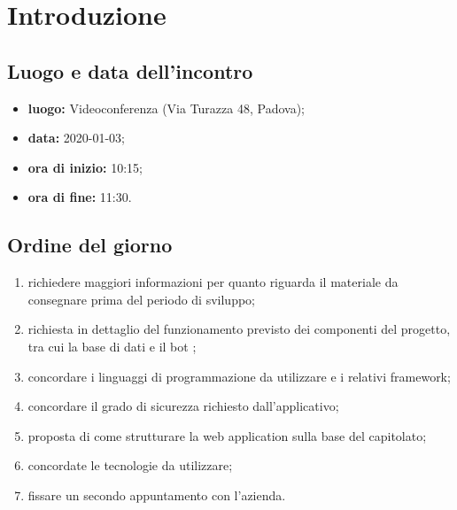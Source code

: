 \section*{Introduzione}

\subsection*{Luogo e data dell'incontro}
	\begin{itemize}
		\item \textbf{luogo:} Videoconferenza (Via Turazza 48, Padova);
		\item \textbf{data:} 2020-01-03;
		\item \textbf{ora di inizio:} 10:15;
		\item \textbf{ora di fine:} 11:30.
	\end{itemize}

\subsection*{Ordine del giorno}
	\begin{enumerate}
		\item richiedere maggiori informazioni per quanto riguarda il materiale da consegnare prima del periodo di sviluppo;
		\item richiesta in dettaglio del funzionamento previsto dei componenti del progetto, tra cui la base di dati e il bot ;
		\item concordare i linguaggi di programmazione da utilizzare e i relativi framework;
		\item concordare il grado di sicurezza richiesto dall'applicativo;
		\item proposta di come strutturare la web application sulla base del capitolato;
		\item concordate le tecnologie da utilizzare;
		\item fissare un secondo appuntamento con l'azienda.
	\end{enumerate}

